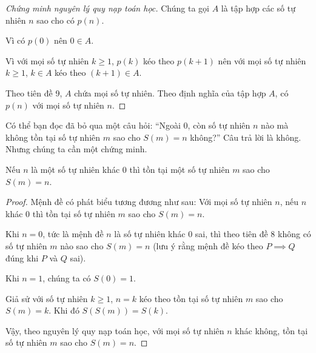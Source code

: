 \begin{proof}[Chứng minh nguyên lý quy nạp toán học]
    Chúng ta gọi $A$ là tập hợp các số tự nhiên $n$ sao cho có $p(n)$.

    Vì có $p(0)$ nên $0\in A$.

    Vì với mọi số tự nhiên $k\geq 1$, $p(k)$ kéo theo $p(k+1)$ nên với mọi số tự nhiên $k\geq 1$, $k\in A$ kéo theo $(k+1)\in A$.

    Theo tiên đề 9, $A$ chứa mọi số tự nhiên. Theo định nghĩa của tập hợp $A$, có $p(n)$ với mọi số tự nhiên $n$.
\end{proof}

Có thể bạn đọc đã bỏ qua một câu hỏi: ``Ngoài $0$, còn số tự nhiên $n$ nào mà không tồn tại số tự nhiên $m$ sao cho $S(m) = n$ không?\@'' Câu trả lời là không. Nhưng chúng ta cần một chứng minh.
\begin{theorem}\label{theorem:successor}
    Nếu $n$ là một số tự nhiên khác $0$ thì tồn tại một số tự nhiên $m$ sao cho $S(m) = n$.
\end{theorem}

\begin{proof}
    Mệnh đề có phát biểu tương đương như sau: Với mọi số tự nhiên $n$, nếu $n$ khác $0$ thì tồn tại số tự nhiên $m$ sao cho $S(m) = n$.

    Khi $n = 0$, tức là mệnh đề $n$ là số tự nhiên khác $0$ sai, thì theo tiên đề 8 không có số tự nhiên $m$ nào sao cho $S(m) = n$ (lưu ý rằng mệnh đề kéo theo $P\implies Q$ đúng khi $P$ và $Q$ sai).

    Khi $n = 1$, chúng ta có $S(0) = 1$.

    Giả sử với số tự nhiên $k\geq 1$, $n = k$ kéo theo tồn tại số tự nhiên $m$ sao cho $S(m) = k$. Khi đó $S(S(m)) = S(k)$.

    Vậy, theo nguyên lý quy nạp toán học, với mọi số tự nhiên $n$ khác không, tồn tại số tự nhiên $m$ sao cho $S(m) = n$.
\end{proof}

